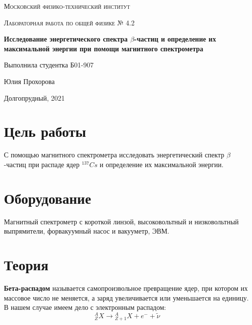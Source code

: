 \documentclass[a4paper]{article}
\begin{document}
\newcommand{\apple}{\char"F8FF}



\begin{titlepage}
    \vspace*{4cm}
	\centering
    {\scshape\LARGE Московский физико-технический институт\par}
	\vspace{1cm}
	{\scshape\Large Лабораторная работа по общей физике № 4.2\par}
	\vspace{1cm}
    {\huge\bfseries  Исследование энергетического спектра $\beta$-частиц и определение их 
    максимальной энергии при помощи магнитного спектрометра \par}
	\vspace{2cm}
	\vfill
\begin{flushright}
	{\large Выполнила студентка Б01-907}\par
	\vspace{0.3cm}
	{\LARGE Юлия Прохорова}
\end{flushright}
	
	\vfill
Долгопрудный, 2021
\end{titlepage}

\pagestyle{fancy} 
\fancyhead[C]{}
\fancyfoot[C]{ \noindent\rule{\textwidth}{0.4pt} \thepage }

\tableofcontents

\newpage


\section{Цель работы}

С помощью магнитного спектрометра исследовать энергетический спектр $\beta$-частиц при распаде
ядер $^{137}Cs$ и определение их максимальной энергии.

\section{Оборудование}
Магнитный спектрометр с короткой линзой, высоковольтный и низковольтный выпрямители, форвакуумный насос и вакууметр, ЭВМ.

\section{Теория}

\textbf{Бета-распадом} называется самопроизвольное превращение ядер, при котором их массовое
число не меняется, а заряд увеличивается или уменьшается на единицу. В нашем случае имеем дело 
с электронным распадом:
$${_Z^A}X \rightarrow {_{Z+1}^A}X + e^- + \tilde{\nu}$$
\end{document}
